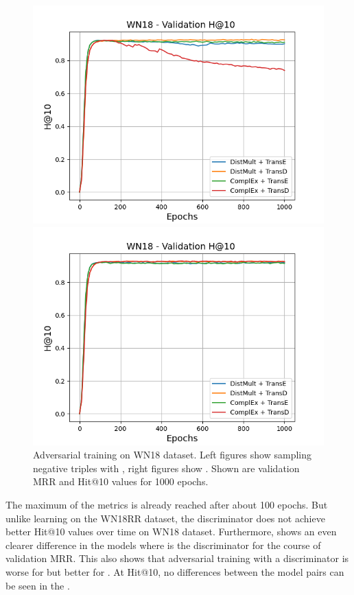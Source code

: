 \begin{figure}[H]
\begin{minipage}{.5\textwidth}
    \end{minipage}
    \begin{minipage}{.5\textwidth}
      \centering
      \includegraphics[width=0.9\linewidth]{figures/results/gan_train/not_pretrained/uncertainty/max/entropy/wn18/1k_epochs/uncertainty_wn18_hit10.png}
    \end{minipage}%
    \begin{minipage}{.5\textwidth}
      \centering
      \includegraphics[width=0.9\linewidth]{figures/results/gan_train/not_pretrained/uncertainty/max_distribution/entropy/wn18/1k_epochs/uncertainty_wn18_hit10.png}
    \end{minipage}%
    \caption{Adversarial training on \textsc{WN18} dataset. 
   Left figures show sampling negative triples with \usmax, right figures show \ussoftmax.
    Shown are validation MRR and Hit@10 values for 1000 epochs.}
    \label{fig:advtrain_wn18_usmax_ussoftmax}
\end{figure}
The maximum of the metrics is already reached after about 100 epochs.
But unlike learning on the \textsc{WN18RR} dataset, the discriminator does not achieve better Hit@10 values over time on \textsc{WN18} dataset.
Furthermore, \ussoftmax shows an even clearer difference in the models where \transd is the discriminator for the course of validation MRR.
This also shows that adversarial training with a \transd discriminator is worse for \usmax but better for \ussoftmax.
At Hit@10, no differences between the model pairs can be seen in the \ussoftmax.

